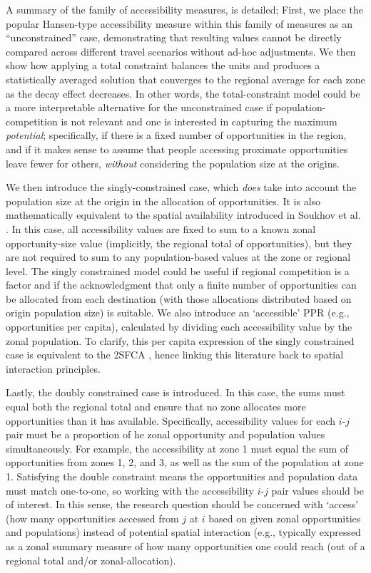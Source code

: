 \documentclass[
  10pt,
  letterpaper,
]{article}
\begin{document}
A summary of the family of accessibility measures, is detailed; First,
we place the popular Hansen-type accessibility measure
\citep{hansen1959} within this family of measures as an
``unconstrained'' case, demonstrating that resulting values cannot be
directly compared across different travel scenarios without ad-hoc
adjustments. We then show how applying a total constraint balances the
units and produces a statistically averaged solution that converges to
the regional average for each zone as the decay effect decreases. In
other words, the total-constraint model could be a more interpretable
alternative for the unconstrained case if population-competition is not
relevant and one is interested in capturing the maximum
\emph{potential}; specifically, if there is a fixed number of
opportunities in the region, and if it makes sense to assume that people
accessing proximate opportunities leave fewer for others, \emph{without}
considering the population size at the origins.

We then introduce the singly-constrained case, which \emph{does} take
into account the population size at the origin in the allocation of
opportunities. It is also mathematically equivalent to the spatial
availability introduced in Soukhov et al.
\citep{soukhovIntroducingSpatialAvailability2023}. In this case, all
accessibility values are fixed to sum to a known zonal opportunity-size
value (implicitly, the regional total of opportunities), but they are
not required to sum to any population-based values at the zone or
regional level. The singly constrained model could be useful if regional
competition is a factor and if the acknowledgment that only a finite
number of opportunities can be allocated from each destination (with
those allocations distributed based on origin population size) is
suitable. We also introduce an `accessible' PPR (e.g., opportunities per
capita), calculated by dividing each accessibility value by the zonal
population. To clarify, this per capita expression of the singly
constrained case is equivalent to the 2SFCA \citep{luo2003, shen1998},
hence linking this literature back to spatial interaction principles.

Lastly, the doubly constrained case is introduced. In this case, the
sums must equal both the regional total and ensure that no zone
allocates more opportunities than it has available. Specifically,
accessibility values for each \(i\)-\(j\) pair must be a proportion of
he zonal opportunity and population values simultaneously. For example,
the accessibility at zone 1 must equal the sum of opportunities from
zones 1, 2, and 3, as well as the sum of the population at zone 1.
Satisfying the double constraint means the opportunities and population
data must match one-to-one, so working with the accessibility
\(i\)-\(j\) pair values should be of interest. In this sense, the
research question should be concerned with `access' (how many
opportunities accessed from \(j\) at \(i\) based on given zonal
opportunities and populations) instead of potential spatial interaction
(e.g., typically expressed as a zonal summary measure of how many
opportunities one could reach (out of a regional total and/or
zonal-allocation).
\end{document}
